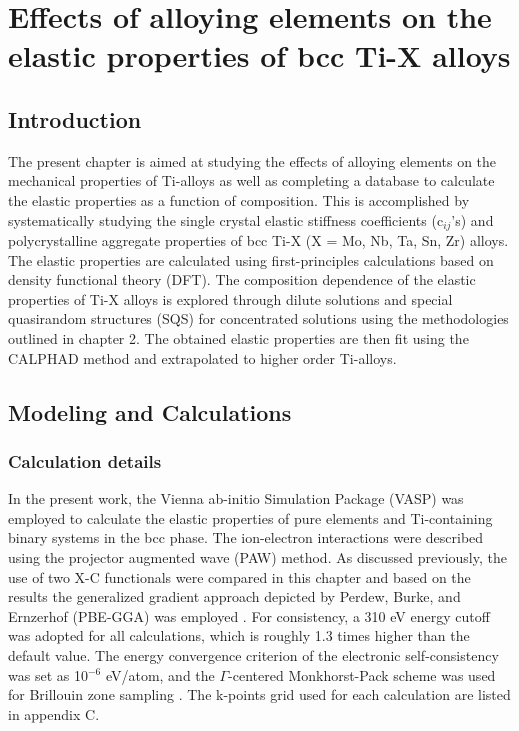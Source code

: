 \chapter{Effects of alloying elements on the elastic properties of bcc Ti-X alloys}

\section{Introduction}

The present chapter is aimed at studying the effects of alloying elements on the mechanical properties of Ti-alloys as well as completing a database to calculate the elastic properties as a function of composition. This is accomplished by systematically studying the single crystal elastic stiffness coefficients (c$_{ij}$'s) and polycrystalline aggregate properties of bcc Ti-X (X = Mo, Nb, Ta, Sn, Zr) alloys. The elastic properties are calculated using first-principles calculations based on density functional theory (DFT). The composition dependence of the elastic properties of Ti-X alloys is explored through dilute solutions and special quasirandom structures (SQS) \cite{Jiang2004} for concentrated solutions using the methodologies outlined in chapter 2. The obtained elastic properties are then fit using the CALPHAD method and extrapolated to higher order Ti-alloys. 

\section{Modeling and Calculations}

\subsection{Calculation details}
In the present work, the Vienna ab-initio Simulation Package (VASP) \cite{Kresse1996} was employed to calculate the elastic properties of pure elements and Ti-containing binary systems in the bcc phase. The ion-electron interactions were described using the projector augmented wave (PAW) \cite{Kresse1999,Blochl1994} method. As discussed previously, the use of two X-C functionals were compared in this chapter and based on the results the generalized gradient approach depicted by Perdew, Burke, and Ernzerhof (PBE-GGA) was employed \cite{Perdew1996a}. For consistency, a 310 eV energy cutoff was adopted for all calculations, which is roughly 1.3 times higher than the default value. The energy convergence criterion of the electronic self-consistency was set as 10$^{-6}$ eV/atom, and the $\Gamma$-centered Monkhorst-Pack scheme was used for Brillouin zone sampling \cite{Kresse1996,Monkhorst1976a}. The k-points grid used for each calculation are listed in appendix C.

